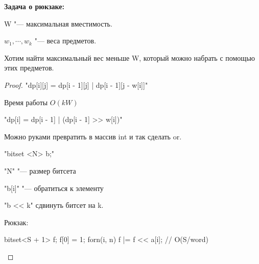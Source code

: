 \textbf{Задача о рюкзаке:}
   
    W "--- максимальная вместимость. 
   
    $w_1, \cdots, w_k$ "--- веса предметов.

    Хотим найти максимальный вес меньше W, который можно 
    набрать с помощью этих предметов.

\begin{proof}    
    
    \cpp"dp[i][j] = dp[i - 1][j] | dp[i - 1][j - w[i]]"

    Время работы $O(kW)$

    \cpp"dp[i] = dp[i - 1] | (dp[i - 1] >> w[i])"

    Можно руками превратить в массив int и так сделать or.

    \cpp"bitset <N> b;" 

    \cpp"N" "--- размер битсета 

    \cpp"b[i]" "--- обратиться к элементу

    \cpp"b << k" сдвинуть битсет на k.

    Рюкзак:
    
    \begin{cppcode}
        bitset<S + 1> f;
        f[0] = 1;
        forn(i, n) 
            f |= f << a[i]; // O(S/word)
    \end{cppcode}
\end{proof}